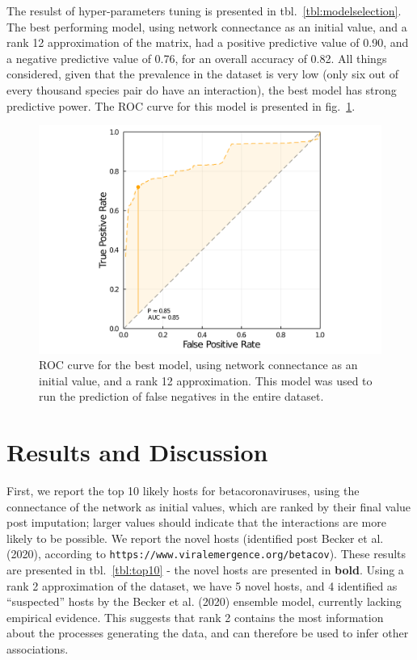 \documentclass[10pt,oneside]{article}
\makeatletter
\def\maxwidth{\ifdim\Gin@nat@width>\linewidth\linewidth
\else\Gin@nat@width\fi}
\let\Oldincludegraphics\includegraphics
\renewcommand{\includegraphics}[1]{\Oldincludegraphics[width=\maxwidth]{#1}}
\makeatother
\begin{document}
The resulst of hyper-parameters tuning is presented in
tbl.~\ref{tbl:modelselection}. The best performing model, using network
connectance as an initial value, and a rank 12 approximation of the
matrix, had a positive predictive value of 0.90, and a negative
predictive value of 0.76, for an overall accuracy of 0.82. All things
considered, given that the prevalence in the dataset is very low (only
six out of every thousand species pair do have an interaction), the best
model has strong predictive power. The ROC curve for this model is
presented in fig.~\ref{fig:roc}.

\begin{figure}
\hypertarget{fig:roc}{%
\centering
\includegraphics{figures/best-model-roc.png}
\caption{ROC curve for the best model, using network connectance as an
initial value, and a rank 12 approximation. This model was used to run
the prediction of false negatives in the entire dataset.}\label{fig:roc}
}
\end{figure}

\hypertarget{results-and-discussion}{%
\section{Results and Discussion}\label{results-and-discussion}}

First, we report the top 10 likely hosts for betacoronaviruses, using
the connectance of the network as initial values, which are ranked by
their final value post imputation; larger values should indicate that
the interactions are more likely to be possible. We report the novel
hosts (identified post Becker et al. (2020), according to
\texttt{https://www.viralemergence.org/betacov}). These results are
presented in tbl.~\ref{tbl:top10} - the novel hosts are presented in
\textbf{bold}. Using a rank 2 approximation of the dataset, we have 5
novel hosts, and 4 identified as ``suspected'' hosts by the Becker et
al. (2020) ensemble model, currently lacking empirical evidence. This
suggests that rank 2 contains the most information about the processes
generating the data, and can therefore be used to infer other
associations.
\end{document}
